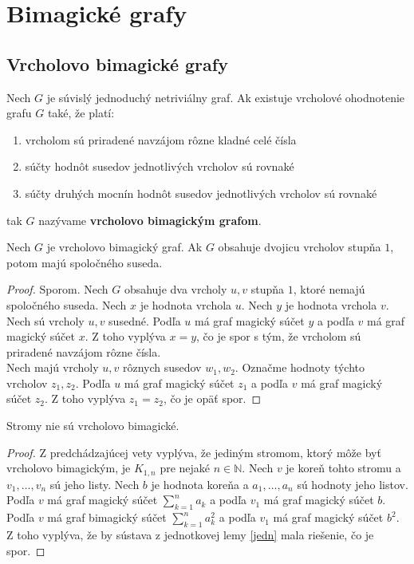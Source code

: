 \section{Bimagické grafy}

\subsection{Vrcholovo bimagické grafy}

\begin{definition} Nech $G$ je súvislý jednoduchý netriviálny graf. Ak existuje vrcholové ohodnotenie grafu $G$ také, že platí:
\begin{enumerate}
\item vrcholom sú priradené navzájom rôzne kladné celé čísla
\item súčty hodnôt susedov jednotlivých vrcholov sú rovnaké
\item súčty druhých mocnín hodnôt susedov jednotlivých vrcholov sú rovnaké
\end{enumerate}
tak $G$ nazývame \textbf{vrcholovo bimagickým grafom}.
\end{definition}

\begin{theorem}
\label{vbgdegree1}
Nech $G$ je vrcholovo bimagický graf. Ak $G$ obsahuje dvojicu vrcholov stupňa $1$, potom majú spoločného suseda.
\end{theorem}

\begin{proof} Sporom. Nech $G$ obsahuje dva vrcholy $u,v$ stupňa $1$, ktoré nemajú spoločného suseda. Nech $x$ je hodnota vrchola $u$. Nech $y$ je hodnota vrchola $v$. \\

Nech sú vrcholy $u,v$ susedné. Podľa $u$ má graf magický súčet $y$ a podľa $v$ má graf magický súčet $x$. Z toho vyplýva $x = y$, čo je spor s tým, že vrcholom sú priradené navzájom rôzne čísla. \\

Nech majú vrcholy $u,v$ rôznych susedov $w_1, w_2$. Označme hodnoty týchto vrcholov $z_1, z_2$. Podľa $u$ má graf magický súčet $z_1$ a podľa $v$ má graf magický súčet $z_2$. Z toho vyplýva $z_1 = z_2$, čo je opäť spor.
\end{proof} 

\begin{consequence} Stromy nie sú vrcholovo bimagické.
\end{consequence}

\begin{proof} Z predchádzajúcej vety vyplýva, že jediným stromom, ktorý môže byť vrcholovo bimagickým, je $K_{1,n}$ pre nejaké $n \in \mathbb{N}$. Nech $v$ je koreň tohto stromu a $v_1, \dots , v_n$ sú jeho listy. Nech $b$ je hodnota koreňa a $a_1, \dots , a_n$ sú hodnoty jeho listov. Podľa $v$ má graf magický súčet $\sum_{k=1}^{n} a_k$ a podľa $v_1$ má graf magický súčet $b$. Podľa $v$ má graf bimagický súčet $\sum_{k=1}^{n} a_k^2$ a podľa $v_1$ má graf magický súčet $b^2$. Z toho vyplýva, že by sústava z jednotkovej lemy \ref{jedn} mala riešenie, čo je spor.
\end{proof} 

